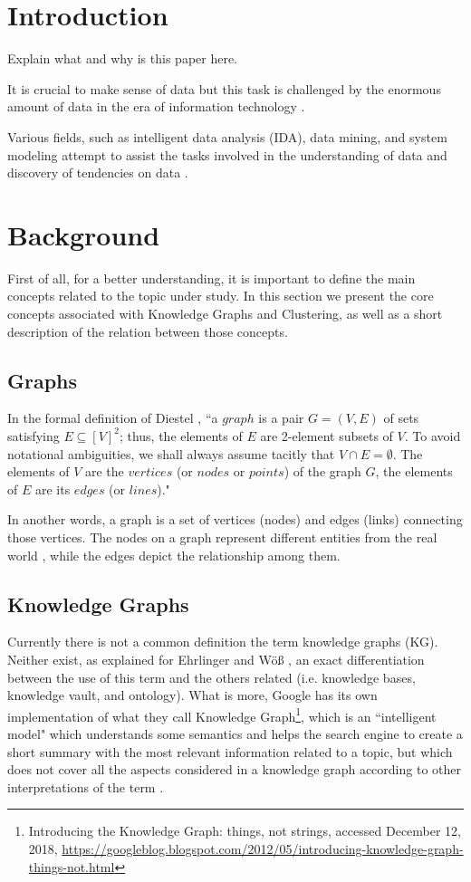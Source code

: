 \documentclass[runningheads]{llncs}
\begin{document}
\section{Introduction}
Explain what and why is this paper here.

It is crucial to make sense of data but this task is challenged by the enormous amount of data in the era of information technology \cite{Pedrycz}.

Various fields, such as intelligent data analysis (IDA), data mining, and system modeling attempt to assist the tasks involved in the understanding of data and discovery of tendencies on data \cite{Pedrycz}.


\section{Background}
First of all, for a better understanding, it is important to define the main concepts related to the topic under study. In this section we present the core concepts associated with Knowledge Graphs and Clustering, as well as a short description of the relation between those concepts.


\subsection{Graphs}
In the formal definition of Diestel \cite{Diestel}, ``a $graph$ is a pair $G = (V, E)$ of sets satisfying $E \subseteq [V]^2$; thus, the elements of $E$ are 2-element subsets of $V$. To avoid notational ambiguities, we shall always assume tacitly that $V \cap E = \emptyset$. The elements of $V$ are the $vertices$ (or $nodes$ or $points$) of the graph $G$, the elements of $E$ are its $edges$ (or $lines$)."

In another words, a graph is a set of vertices (nodes) and edges (links) connecting those vertices. The nodes on a graph represent different entities from the real world \cite{Robinson}, while the edges depict the relationship among them.

\subsection{Knowledge Graphs}
Currently there is not a common definition the term knowledge graphs (KG). Neither exist, as explained for Ehrlinger and W{\"o}{\ss} \cite{Ehrlinger}, an exact differentiation between the use of this term and the others related (i.e. knowledge bases, knowledge vault, and ontology). What is more, Google has its own implementation of what they call Knowledge Graph\footnote{Introducing the Knowledge Graph: things, not strings, accessed December 12, 2018,  \href{https://googleblog.blogspot.com/2012/05/introducing-knowledge-graph-things-not.html}{https://googleblog.blogspot.com/2012/05/introducing-knowledge-graph-things-not.html}}, which is an ``intelligent model" which understands some semantics and helps the search engine to create a short summary with the most relevant information related to a topic, but which does not cover all the aspects considered in a knowledge graph according to other interpretations of the term \cite{Ehrlinger}.
\end{document}
